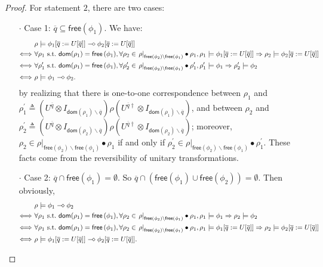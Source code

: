 \documentclass[conference,compsoc, 10pt]{IEEEtran}
\newcommand {\qbar} {{\overline{q}}}
\newcommand {\qU} {{\overline{q}:=U[\overline{q}]}}
\newcommand {\id } {{I}}
\newcommand {\dom }[1] {{\mathsf{dom}\!\left(#1\right)}}
\newcommand {\free }[1] {{\mathsf{free}\left(#1\right)}}
\newcommand {\rt }[2] {{\left.{#1}\right|_{#2}}}
\newcommand {\sdimp} {\mathrel{-\mkern-2.5mu\diamond}}
\begin{document}
\begin{appendices}
\begin{proof}
			For statement $\mathit 2$, there are two cases:
			\begin{itemize}
				\item[$\cdot$]Case 1: $\qbar\subseteq\free{\phi_1}$. We have:
				\begin{align*}
				&\rho\models\phi_1[\qU]\sdimp\phi_2[\qU] \\
				\Longleftrightarrow\ &\forall\rho_1\text{\ s.t.\ }\dom{\rho_1}=\free{\phi_1}, \forall\rho_2\in\rt{\rho}{\free{\phi_2}\backslash\free{\phi_1}}\bullet\rho_1, \rho_1\models\phi_1[\qU]\Rightarrow\rho_2\models\phi_2[\qU] \\
				\Longleftrightarrow\ &\forall\rho_1^\prime\text{\ s.t.\ }\dom{\rho_1}=\free{\phi_1}, \forall\rho_2^\prime\in\rt{\rho}{\free{\phi_2}\backslash\free{\phi_1}}\bullet\rho_1^\prime, \rho_1^\prime\models\phi_1\Rightarrow\rho_2^\prime\models\phi_2 \\
				\Longleftrightarrow\ &\rho\models\phi_1\sdimp\phi_2. 
				\end{align*}
				by realizing that there is one-to-one correspondence between $\rho_1$ and $\rho_1^\prime\triangleq(U^{\qbar}\otimes\id_{\dom{\rho_1}\backslash\qbar})\rho(U^{\qbar\dag}\otimes\id_{\dom{\rho_1}\backslash\qbar})$, and between $\rho_2$ and $\rho_2^\prime\triangleq(U^{\qbar}\otimes\id_{\dom{\rho_2}\backslash\qbar})\rho(U^{\qbar\dag}\otimes\id_{\dom{\rho_2}\backslash\qbar})$; moreover, $\rho_2\in\rt{\rho}{\free{\phi_2}\backslash\free{\phi_1}}\bullet\rho_1$ if and only if $\rho_2^\prime\in\rt{\rho}{\free{\phi_2}\backslash\free{\phi_1}}\bullet\rho_1^\prime$. These facts come from the reversibility of unitary transformations.
				
				\item[$\cdot$]Case 2: $\qbar\cap\free{\phi_1} = \emptyset$. So $\qbar\cap(\free{\phi_1}\cup\free{\phi_2}) = \emptyset$. Then obviously,
				\begin{align*}
				&\rho\models\phi_1\sdimp\phi_2 \\
				\Longleftrightarrow\ &\forall\rho_1\text{\ s.t.\ }\dom{\rho_1}=\free{\phi_1}, \forall\rho_2\in\rt{\rho}{\free{\phi_2}\backslash\free{\phi_1}}\bullet\rho_1, \rho_1\models\phi_1\Rightarrow\rho_2\models\phi_2 \\
				\Longleftrightarrow\ &\forall\rho_1\text{\ s.t.\ }\dom{\rho_1}=\free{\phi_1}, \forall\rho_2\in\rt{\rho}{\free{\phi_2}\backslash\free{\phi_1}}\bullet\rho_1, \rho_1\models\phi_1[\qU]\Rightarrow\rho_2\models\phi_2[\qU] \\
				\Longleftrightarrow\ &\rho\models\phi_1[\qU]\sdimp\phi_2[\qU]. 
				\end{align*}
			\end{itemize}
		\end{proof}
		

\end{appendices}
\end{document}
